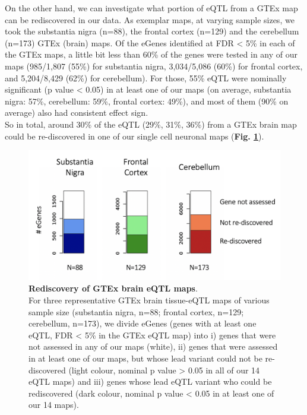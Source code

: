 On the other hand,
we can investigate what portion of eQTL from a GTEx map can be rediscovered in our data.
As exemplar maps, at varying sample sizes, we took the substantia nigra (n=88), the frontal cortex (n=129) and the cerebellum (n=173) GTEx (brain) maps.
Of the eGenes identified at FDR < 5\% in each of the GTEx maps, a little bit less than 60\% of the genes were tested in any of our maps 
(985/1,807 (55\%) for substantia nigra,
3,034/5,086 (60\%) for frontal cortex, 
and 5,204/8,429 (62\%) for cerebellum).
For those, 55\% eQTL were nominally significant (p value < 0.05) in at least one of our maps (on average, substantia nigra: 57\%, cerebellum: 59\%, frontal cortex: 49\%), 
and most of them
(90\% on average) also had consistent effect sign. \\

So in total, around 30\% of the eQTL (29\%, 31\%, 36\%)
from a GTEx brain map could be re-discovered in one of our single cell neuronal maps (\textbf{Fig. \ref{fig:neuroseq_and_gtex_rediscovery}}).

\begin{figure}[h]
\centering
\includegraphics[width=16cm]{Chapter5/Fig/neuroseq_rediscovering_gtex_brain.png}
\caption[Rediscovery of GTEx brain eQTL maps]{\textbf{Rediscovery of GTEx brain eQTL maps}.\\
For three representative GTEx brain tissue-eQTL maps of various sample size (substantia nigra, n=88; frontal cortex, n=129; cerebellum, n=173), we divide eGenes (genes with at least one eQTL, FDR < 5\% in the GTEx eQTL map) into i) genes that were not assessed in any of our maps (white), ii) genes that were assessed in at least one of our maps, but whose lead variant could not be re-discovered (light colour, nominal p value > 0.05 in all of our 14 eQTL maps) and iii) genes whose lead eQTL variant who could be rediscovered (dark colour, nominal p value < 0.05 in at least one of our 14 maps).}
\label{fig:neuroseq_and_gtex_rediscovery}
\end{figure}


